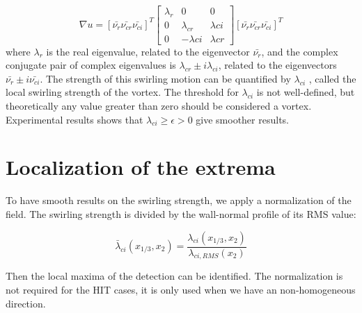 \documentclass[12pt, a4paper, openany]{memoir}
\begin{document}
\begin{equation}
\nabla u = [\bar{\nu_r} \bar{\nu_{cr}} \bar{\nu_{ci}}]^T
\left[\begin{array}{ccc}
\lambda_r & 0 & 0 \\
0 & \lambda_{cr} & \lambda{ci} \\
0 & -\lambda{ci} & \lambda{cr} \end{array}\right]
[\bar{\nu_r} \bar{\nu_{cr}} \bar{\nu_{ci}}]^T
\end{equation} 
where $\lambda_r$ is the real eigenvalue, related to the eigenvector $\bar{\nu_r}$, and the complex conjugate pair of complex eigenvalues is $\lambda_{cr}  \pm i\lambda_{ci}$, related to the eigenvectors $\bar{\nu_r} \pm i\bar{\nu_{ci}}$. The strength of this swirling motion can be quantified by $\lambda_{ci}$ , called the local swirling strength of the vortex. The threshold for $\lambda_{ci}$ is not well-defined, but theoretically any value greater than zero should be considered a vortex. Experimental results \cite{zhou1999} shows that $\lambda_{ci} \geq \epsilon > 0$ give smoother results.


\section{Localization of the extrema}

To have smooth results on the swirling strength, we apply a normalization of the field. The swirling strength is divided by the wall-normal profile of its RMS value:

\begin{equation}
\bar{\lambda}_{ci}(x_{1/3},x_2) = \frac{\lambda_{ci}(x_{1/3},x_2)}{\lambda_{ci,RMS}(x_2)}
\end{equation}

Then the local maxima of the detection can be identified. The normalization is not required for the HIT cases, it is only used when we have an non-homogeneous direction.
\end{document}

